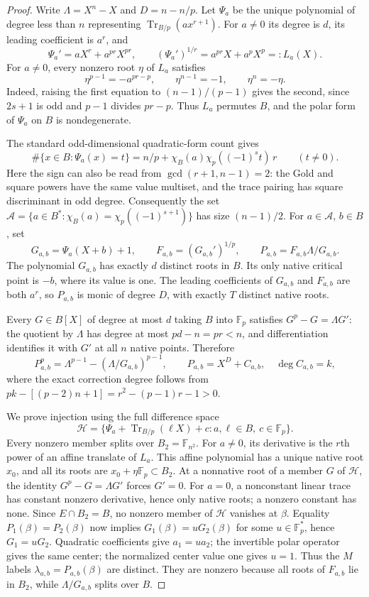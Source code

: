\begin{proof}
Write $\Lambda=X^n-X$ and $D=n-n/p$. Let $\Psi_a$ be the unique
polynomial of degree less than $n$ representing
$\operatorname{Tr}_{B/p}(a x^{r+1})$. For $a\ne0$ its degree is $d$, its leading
coefficient is $a^r$, and
\[
 \Psi_a'=aX^r+a^{pr}X^{pr},\qquad
 (\Psi_a')^{1/r}=a^{pr}X+a^pX^p=:L_a(X).
\]
For $a\ne0$, every nonzero root $\eta$ of $L_a$ satisfies
\[
 \eta^{p-1}=-a^{pr-p},\qquad \eta^{n-1}=-1,\qquad \eta^n=-\eta.
\]
Indeed, raising the first equation to $(n-1)/(p-1)$ gives the
second, since $2s+1$ is odd and $p-1$ divides $pr-p$.
Thus $L_a$ permutes $B$, and the polar form of $\Psi_a$ on $B$
is nondegenerate.

The standard odd-dimensional quadratic-form count gives
\[
 \#\{x\in B:\Psi_a(x)=t\}
 =n/p+\chi_B(a)\chi_p((-1)^s t)\,r\qquad(t\ne0).
\]
Here the sign can also be read from
$\gcd(r+1,n-1)=2$: the Gold and square powers have the same
value multiset, and the trace pairing has square discriminant in
odd degree. Consequently the set
$\mathcal A=\{a\in B^*:\chi_B(a)=\chi_p((-1)^{s+1})\}$
has size $(n-1)/2$. For $a\in\mathcal A$, $b\in B$, set
\[
 G_{a,b}=\Psi_a(X+b)+1,\qquad F_{a,b}=(G_{a,b}')^{1/p},
 \qquad P_{a,b}=F_{a,b}\Lambda/G_{a,b}.
\]
The polynomial $G_{a,b}$ has exactly $d$ distinct roots in $B$.
Its only native critical point is $-b$, where its value is one.
The leading coefficients of $G_{a,b}$ and $F_{a,b}$ are both
$a^r$, so $P_{a,b}$ is monic of degree $D$, with exactly $T$
distinct native roots.

Every $G\in B[X]$ of degree at most $d$ taking $B$ into
$\mathbb F_p$ satisfies $G^p-G=\Lambda G'$: the quotient by
$\Lambda$ has degree at most $pd-n=pr<n$, and differentiation
identifies it with $G'$ at all $n$ native points. Therefore
\[
 P_{a,b}^p=\Lambda^{p-1}-(\Lambda/G_{a,b})^{p-1},\qquad
 P_{a,b}=X^D+C_{a,b},\quad \deg C_{a,b}=k,
\]
where the exact correction degree follows from
$pk-[(p-2)n+1]=r^2-(p-1)r-1>0$.

We prove injection using the full difference space
\[
 \mathcal H=\{\Psi_a+\operatorname{Tr}_{B/p}(\ell X)+c:
              a,\ell\in B,\ c\in\mathbb F_p\}.
\]
Every nonzero member splits over $B_2=\mathbb F_{n^2}$.
For $a\ne0$, its derivative is the $r$th power of an affine
translate of $L_a$. This affine polynomial has a unique native
root $x_0$, and all its roots are $x_0+\eta\mathbb F_p\subset B_2$.
At a nonnative root of a member $G$ of $\mathcal H$, the identity
$G^p-G=\Lambda G'$ forces $G'=0$. For $a=0$, a nonconstant
linear trace has constant nonzero derivative, hence only native
roots; a nonzero constant has none.
Since $E\cap B_2=B$, no nonzero member of $\mathcal H$ vanishes
at $\beta$. Equality $P_1(\beta)=P_2(\beta)$ now implies
$G_1(\beta)=uG_2(\beta)$ for some $u\in\mathbb F_p^*$, hence
$G_1=uG_2$. Quadratic coefficients give $a_1=ua_2$; the invertible
polar operator gives the same center; the normalized center value
one gives $u=1$. Thus the $M$ labels $\lambda_{a,b}=P_{a,b}(\beta)$
are distinct. They are nonzero because all roots of $F_{a,b}$
lie in $B_2$, while $\Lambda/G_{a,b}$ splits over $B$.


\end{proof}
